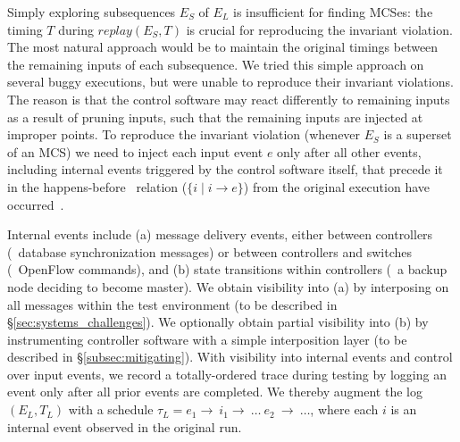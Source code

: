 Simply exploring subsequences $E_S$ of $E_L$ is insufficient for finding MCSes: the
timing $T$ during $replay(E_S, T)$ is crucial for
reproducing the invariant violation. The most natural approach would be to maintain the original
timings between the remaining inputs of each subsequence.
We tried this simple approach on several buggy executions, but were unable to reproduce
their invariant violations. The reason is that the control software may react
differently to
remaining inputs as a result of pruning inputs, such that the remaining inputs
are injected at improper points.
To reproduce the invariant violation (whenever $E_S$ is a superset of an MCS)
we need to inject each input event $e$ only after all other
events, including internal events triggered by the control software itself,
that precede it in the
happens-before~\cite{Lamport:1978:TCO:359545.359563}
relation ($\{i \mid i \rightarrow e\}$) from the original execution have
occurred~\cite{tel2000introduction}.

Internal events include
(a) message delivery events, either between controllers (\eg~database
synchronization messages) or
between controllers and switches (\eg~OpenFlow commands), and (b) state transitions
within controllers (\eg~a backup node deciding to become master).
We obtain visibility into (a) by interposing on all messages within the test
environment (to be described in \S\ref{sec:systems_challenges}).
We optionally obtain partial visibility into (b) by instrumenting controller
software with a simple interposition layer (to be described in \S\ref{subsec:mitigating}).
With visibility into internal events and control over input events, we
record a totally-ordered trace during testing by logging an event only after
all prior events are completed. We thereby augment the log $(E_L, T_L)$ with a schedule
$\tau_L = e_1\rightarrow~i_1\rightarrow~\dots~e_2~\rightarrow~\dots$, where
each $i$ is an internal event observed in the original run.

